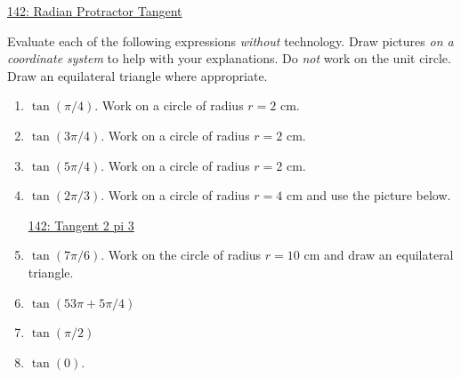 \documentclass{ximera}
\begin{document}
\href{https://www.desmos.com/calculator/jnrpouwmuv}{142: Radian Protractor Tangent}


\begin{question} \label{QDrLMDndvvV}
Evaluate each of the following expressions \emph{without} technology. Draw pictures \emph{on a coordinate system} to help with your explanations. Do \emph{not} work on the unit circle. Draw an equilateral triangle where appropriate. 

\begin{enumerate}
\item $\tan(\pi/4)$. Work on a circle of radius $r=2$ cm.

\item $\tan(3\pi/4)$. Work on a circle of radius $r=2$ cm.

\item $\tan(5\pi/4)$. Work on a circle of radius $r=2$ cm.

\item $\tan(2\pi/3)$. Work on a circle of radius $r=4$ cm and use the picture below.

\begin{onlineOnly}
    \begin{center}
\end{center}
\end{onlineOnly}

\href{https://www.desmos.com/calculator/nfykqfigej}{142: Tangent 2 pi 3}

\item $\tan(7\pi/6)$. Work on the circle of radius $r=10$ cm and draw an equilateral triangle.

\item $\tan(53\pi + 5\pi/4)$

\item $\tan(\pi/2)$

\item $\tan(0)$.

\end{enumerate}
\end{question}
\end{document}
